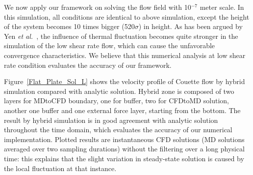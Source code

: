 \documentclass[preprint,12pt]{elsarticle}
\begin{document}


We now apply our framework on solving the flow field with 10$^{-7}$ meter scale. In this simulation, all conditions are identical to above simulation, except the height of the system becomes 10 times bigger (520$\sigma$) in height. As has been argued by Yen {\it{et al.}}~\cite{Yen}, the influence of thermal fluctuation becomes quite stronger in the simulation of the low shear rate flow, which can cause the unfavorable convergence characteristics. We believe that this numerical analysis at low shear rate condition evaluates the accuracy of our framework.

Figure~\ref{Flat_Plate_Sol_L} shows the velocity profile of Couette flow by hybrid simulation compared with analytic solution. Hybrid zone is composed of two layers for MDtoCFD boundary, one for buffer, two for CFDtoMD solution, another one buffer and one external force layer, starting from the bottom. The result by hybrid simulation is in good agreement with analytic solution throughout the time domain, which evaluates the accuracy of our numerical implementation. Plotted results are instantaneous CFD solutions (MD solutions averaged over two sampling durations) without the filtering over a long physical time: this explains that the slight variation in steady-state solution is caused by the local fluctuation at that instance.
\end{document}
